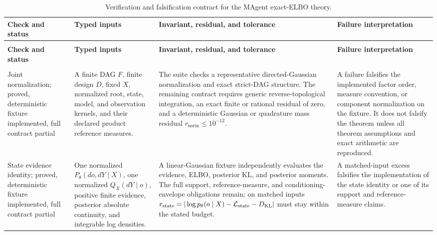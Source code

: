 \scriptsize
\begin{longtable}{>{\raggedright\arraybackslash}p{}>{\raggedright\arraybackslash}p{}>{\raggedright\arraybackslash}p{}>{\raggedright\arraybackslash}p{}}
\caption{Verification and falsification contract for the MAgent exact-ELBO theory.}
\label{tab:magent-verification-oracles}\\
\toprule
\textbf{Check and status} & \textbf{Typed inputs} & \textbf{Invariant, residual, and tolerance} & \textbf{Failure interpretation} \\
\midrule
\endfirsthead
\multicolumn{4}{l}{\textit{Table \thetable\ continued}}\\
\toprule
\textbf{Check and status} & \textbf{Typed inputs} & \textbf{Invariant, residual, and tolerance} & \textbf{Failure interpretation} \\
\midrule
\endhead
\midrule
\multicolumn{4}{r}{\textit{Continued on next page}}\\
\endfoot
\bottomrule
\endlastfoot
Joint normalization; proved, deterministic fixture implemented, full contract partial & A finite DAG \(F\), finite design \(D\), fixed \(X\), normalized root, state, model, and observation kernels, and their declared product reference measures. & The suite checks a representative directed-Gaussian normalization and exact strict-DAG structure. The remaining contract requires generic reverse-topological integration, an exact finite or rational residual of zero, and a deterministic Gaussian or quadrature mass residual \(r_{\mathrm{norm}}\leq10^{-12}\). & A failure falsifies the implemented factor order, measure convention, or component normalization on the fixture. It does not falsify the theorem unless all theorem assumptions and exact arithmetic are reproduced. \\
\addlinespace
State evidence identity; proved, deterministic fixture implemented, full contract partial & One normalized \(P_\theta(do,dY\mid X)\), one normalized \(Q_X(dY\mid o)\), positive finite evidence, posterior absolute continuity, and integrable log densities. & A linear-Gaussian fixture independently evaluates the evidence, ELBO, posterior KL, and posterior moments. The full support, reference-measure, and conditioning-envelope obligations remain; on matched inputs \(r_{\mathrm{state}}=|\log p_\theta(o\mid X)-\mathcal L_{\mathrm{state}}-D_{\mathrm{KL}}|\) must stay within the stated budget. & A matched-input excess falsifies the implementation of the state identity or one of its support and reference-measure claims. \\

\end{longtable}
